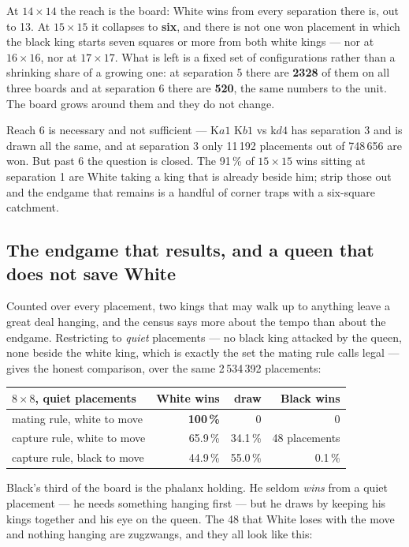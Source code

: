 \documentclass[11pt]{article}
\begin{document}
\noindent
At $14\times14$ the reach is the board: White wins from every separation there
is, out to 13. At $15\times15$ it collapses to \textbf{six}, and there is not one
won placement in which the black king starts seven squares or more from both
white kings --- nor at $16\times16$, nor at $17\times17$. What is left is a fixed
set of configurations rather than a shrinking share of a growing one: at
separation 5 there are \textbf{2328} of them on all three boards and at
separation 6 there are \textbf{520}, the same numbers to the unit. The board
grows around them and they do not change.

Reach 6 is necessary and not sufficient --- K$a1$ K$b1$ vs k$d4$ has separation
3 and is drawn all the same, and at separation 3 only 11\,192 placements out of
748\,656 are won. But past 6 the question is closed. The 91\,\% of $15\times15$
wins sitting at separation 1 are White taking a king that is already beside him;
strip those out and the endgame that remains is a handful of corner traps with a
six-square catchment.

\subsection{The endgame that results, and a queen that does not save White}\label{sub:cap-queen}

Counted over every placement, two kings that may walk up to anything leave a
great deal hanging, and the census says more about the tempo than about the
endgame. Restricting to \emph{quiet} placements --- no black king attacked by
the queen, none beside the white king, which is exactly the set the mating rule
calls legal --- gives the honest comparison, over the same 2\,534\,392
placements:

\begin{center}\small
\begin{tabular}{@{}lrrr@{}}
\toprule
$8\times8$, quiet placements & White wins & draw & Black wins \\
\midrule
mating rule, white to move   & \textbf{100\,\%} & 0 & 0 \\
capture rule, white to move  & 65.9\,\% & 34.1\,\% & 48 placements \\
capture rule, black to move  & 44.9\,\% & 55.0\,\% & 0.1\,\% \\
\bottomrule
\end{tabular}
\end{center}

\noindent
Black's third of the board is the phalanx holding. He seldom \emph{wins} from a
quiet placement --- he needs something hanging first --- but he draws by keeping
his kings together and his eye on the queen. The 48 that White loses with the
move and nothing hanging are zugzwangs, and they all look like this:
\end{document}
